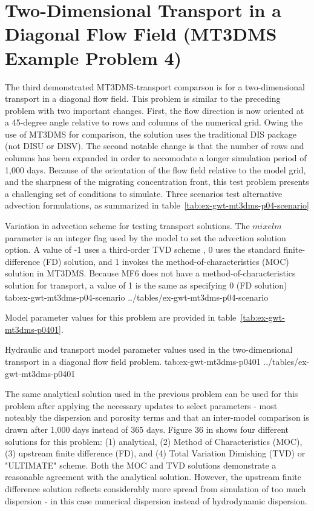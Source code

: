 \section{Two-Dimensional Transport in a Diagonal Flow Field (MT3DMS Example Problem 4)}

The third demonstrated MT3DMS-\mf transport comparson is for a two-dimensional transport in a diagonal flow field. This problem is similar to the preceding problem with two important changes. First, the flow direction is now oriented at a 45-degree angle relative to rows and columns of the numerical grid. Owing the use of MT3DMS for comparison, the \mf solution uses the traditional DIS package (not DISU or DISV).  The second notable change is that the number of rows and columns has been expanded in order to accomodate a longer simulation period of 1,000 days. Because of the orientation of the flow field relative to the model grid, and the sharpness of the migrating concentration front, this test problem presents a challenging set of conditions to simulate. Three scenarios test alternative advection formulations, as summarized in table~\ref{tab:ex-gwt-mt3dms-p04-scenario}

\begin{ScenarioTable}{
       Variation in advection scheme for testing transport solutions. The $mixelm$ parameter is an integer flag used by the model to set the advection solution option.  A value of -1 uses a third-order TVD scheme \citep{zheng1999mt3dms}, 0 uses the standard finite-difference (FD) solution, and 1 invokes the method-of-characteristics (MOC) solution in MT3DMS.  Because MF6 does not have a method-of-characteristics solution for transport, a value of 1 is the same as specifying 0 (FD solution)}
       {tab:ex-gwt-mt3dms-p04-scenario}
       {../tables/ex-gwt-mt3dms-p04-scenario}
\end{ScenarioTable}

Model parameter values for this problem are provided in table~\ref{tab:ex-gwt-mt3dms-p0401}.

\begin{StandardTable}
	{Hydraulic and transport model parameter values used in the two-dimensional transport in a diagonal flow field problem.}
	{tab:ex-gwt-mt3dms-p0401}
	{../tables/ex-gwt-mt3dms-p0401}
\end{StandardTable}

The same analytical solution used in the previous problem can be used for this problem after applying the necessary updates to select parameters - most noteably the dispersion and porosity terms and that an inter-model comparison is drawn after 1,000 days instead of 365 days. Figure 36 in \cite{zheng1999mt3dms} shows four different solutions for this problem: (1) analytical, (2) Method of Characteristics (MOC), (3) upstream finite difference (FD), and (4) Total Variation Dimishing (TVD) or "ULTIMATE" scheme.  Both the MOC and TVD solutions demonstrate a reasonable agreement with the analytical solution. However, the upstream finite difference solution reflects considerably more spread from simulation of too much dispersion - in this case numerical dispersion instead of hydrodynamic dispersion. 

